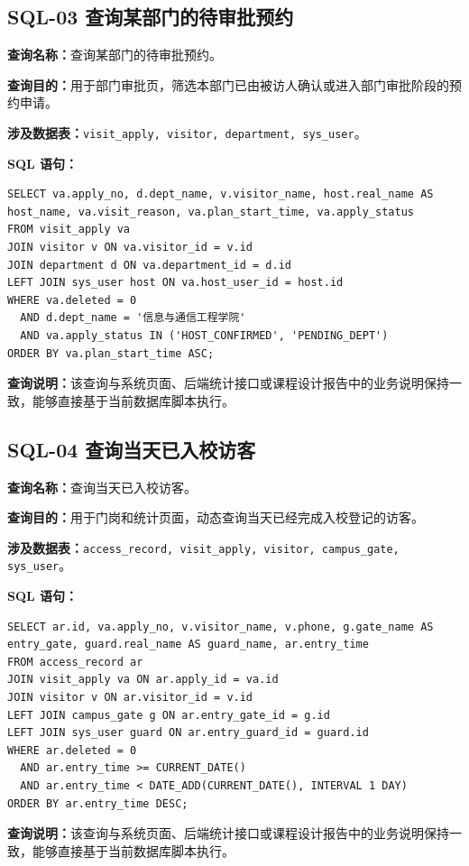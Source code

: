 \subsection{SQL-03 查询某部门的待审批预约}
\textbf{查询名称：}查询某部门的待审批预约。\par
\textbf{查询目的：}用于部门审批页，筛选本部门已由被访人确认或进入部门审批阶段的预约申请。\par
\textbf{涉及数据表：}\texttt{visit\_apply, visitor, department, sys\_user}。\par
\textbf{SQL 语句：}
\begin{lstlisting}[style=sqlstyle]
SELECT va.apply_no, d.dept_name, v.visitor_name, host.real_name AS host_name, va.visit_reason, va.plan_start_time, va.apply_status
FROM visit_apply va
JOIN visitor v ON va.visitor_id = v.id
JOIN department d ON va.department_id = d.id
LEFT JOIN sys_user host ON va.host_user_id = host.id
WHERE va.deleted = 0
  AND d.dept_name = '信息与通信工程学院'
  AND va.apply_status IN ('HOST_CONFIRMED', 'PENDING_DEPT')
ORDER BY va.plan_start_time ASC;
\end{lstlisting}
\textbf{查询说明：}该查询与系统页面、后端统计接口或课程设计报告中的业务说明保持一致，能够直接基于当前数据库脚本执行。

\subsection{SQL-04 查询当天已入校访客}
\textbf{查询名称：}查询当天已入校访客。\par
\textbf{查询目的：}用于门岗和统计页面，动态查询当天已经完成入校登记的访客。\par
\textbf{涉及数据表：}\texttt{access\_record, visit\_apply, visitor, campus\_gate, sys\_user}。\par
\textbf{SQL 语句：}
\begin{lstlisting}[style=sqlstyle]
SELECT ar.id, va.apply_no, v.visitor_name, v.phone, g.gate_name AS entry_gate, guard.real_name AS guard_name, ar.entry_time
FROM access_record ar
JOIN visit_apply va ON ar.apply_id = va.id
JOIN visitor v ON ar.visitor_id = v.id
LEFT JOIN campus_gate g ON ar.entry_gate_id = g.id
LEFT JOIN sys_user guard ON ar.entry_guard_id = guard.id
WHERE ar.deleted = 0
  AND ar.entry_time >= CURRENT_DATE()
  AND ar.entry_time < DATE_ADD(CURRENT_DATE(), INTERVAL 1 DAY)
ORDER BY ar.entry_time DESC;
\end{lstlisting}
\textbf{查询说明：}该查询与系统页面、后端统计接口或课程设计报告中的业务说明保持一致，能够直接基于当前数据库脚本执行。

